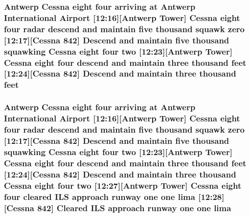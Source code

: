\subsubsection[{\texorpdfstring{feet}{feet}}]{\setlength{\rightskip}{0pt plus 5cm}Antwerp {\bf Cessna} eight four arriving at Antwerp International {\bf Airport} \mbox{[}12\+:16\mbox{]}\mbox{[}Antwerp {\bf Tower}\mbox{]} {\bf Cessna} eight four radar descend and maintain five {\bf thousand} squawk {\bf zero} \mbox{[}12\+:17\mbox{]}\mbox{[}{\bf Cessna} 842\mbox{]} Descend and maintain five {\bf thousand} {\bf squawking} {\bf Cessna} eight four {\bf two} \mbox{[}12\+:23\mbox{]}\mbox{[}Antwerp {\bf Tower}\mbox{]} {\bf Cessna} eight four descend and maintain three {\bf thousand} feet \mbox{[}12\+:24\mbox{]}\mbox{[}{\bf Cessna} 842\mbox{]} Descend and maintain three {\bf thousand} feet}\hypertarget{happyDay2ExpectedATC_8txt_adb5a296986a5b6019ec88f520f243c26}{}\label{happyDay2ExpectedATC_8txt_adb5a296986a5b6019ec88f520f243c26}
\subsubsection[{\texorpdfstring{lima}{lima}}]{\setlength{\rightskip}{0pt plus 5cm}Antwerp {\bf Cessna} eight four arriving at Antwerp International {\bf Airport} \mbox{[}12\+:16\mbox{]}\mbox{[}Antwerp {\bf Tower}\mbox{]} {\bf Cessna} eight four radar descend and maintain five {\bf thousand} squawk {\bf zero} \mbox{[}12\+:17\mbox{]}\mbox{[}{\bf Cessna} 842\mbox{]} Descend and maintain five {\bf thousand} {\bf squawking} {\bf Cessna} eight four {\bf two} \mbox{[}12\+:23\mbox{]}\mbox{[}Antwerp {\bf Tower}\mbox{]} {\bf Cessna} eight four descend and maintain three {\bf thousand} {\bf feet} \mbox{[}12\+:24\mbox{]}\mbox{[}{\bf Cessna} 842\mbox{]} Descend and maintain three {\bf thousand} {\bf Cessna} eight four {\bf two} \mbox{[}12\+:27\mbox{]}\mbox{[}Antwerp {\bf Tower}\mbox{]} {\bf Cessna} eight four cleared I\+LS approach runway {\bf one} {\bf one} lima \mbox{[}12\+:28\mbox{]}\mbox{[}{\bf Cessna} 842\mbox{]} Cleared I\+LS approach runway {\bf one} {\bf one} lima}\hypertarget{happyDay2ExpectedATC_8txt_a7b00d28574232f99d7aa26b480b68bc4}{}\label{happyDay2ExpectedATC_8txt_a7b00d28574232f99d7aa26b480b68bc4}

